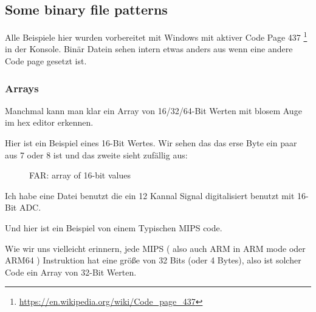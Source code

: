
\subsection{Some binary file patterns} %

Alle Beispiele hier wurden vorbereitet mit Windows mit aktiver Code Page 437
\footnote{\url{https://en.wikipedia.org/wiki/Code_page_437}} in der Konsole.
Binär Datein sehen intern etwas anders aus wenn eine andere Code page gesetzt ist.


\clearpage
\subsubsection{Arrays}

Manchmal kann man klar ein Array von 16/32/64-Bit Werten mit blosem Auge im hex editor erkennen.

Hier ist ein Beispiel eines 16-Bit Wertes.
Wir sehen das das erse Byte ein paar aus 7 oder 8 ist und das zweite sieht
zufällig aus:

\begin{figure}[H]
\centering
{}
\caption{FAR: array of 16-bit values}
\end{figure}

Ich habe eine Datei benutzt die ein 12 Kannal Signal digitalisiert benutzt mit 16-Bit \ac{ADC}. %

\clearpage
{}
\par Und hier ist ein Beispiel von einem Typischen MIPS code.

Wie wir uns vielleicht erinnern, jede MIPS ( also auch ARM in ARM mode oder ARM64 ) Instruktion hat eine größe von 32 Bits (oder 4 Bytes),
also ist solcher Code ein Array von 32-Bit Werten. 

